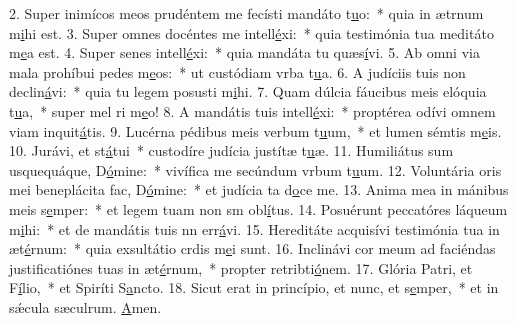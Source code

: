 2. Super inimícos meos prudéntem me fecísti mandáto t\uline{u}o:~* quia in ætrnum m\uline{i}hi est.
3. Super omnes docéntes me intell\uline{é}xi:~* quia testimónia tua meditáto m\uline{e}a est.
4. Super senes intell\uline{é}xi:~* quia mandáta tu quæs\uline{í}vi.
5. Ab omni via mala prohíbui pedes m\uline{e}os:~* ut custódiam vrba t\uline{u}a.
6. A judíciis tuis non declin\uline{á}vi:~* quia tu legem posusti m\uline{i}hi.
7. Quam dúlcia fáucibus meis elóquia t\uline{u}a,~* super mel ri m\uline{e}o!
8. A mandátis tuis intell\uline{é}xi:~* proptérea odívi omnem viam inquit\uline{á}tis.
9. Lucérna pédibus meis verbum t\uline{u}um,~* et lumen sémtis m\uline{e}is.
10. Jurávi, et st\uline{á}tui~* custodíre judícia justítæ t\uline{u}æ.
11. Humiliátus sum usquequáque, D\uline{ó}mine:~* vivífica me secúndum vrbum t\uline{u}um.
12. Voluntária oris mei beneplácita fac, D\uline{ó}mine:~* et judícia ta d\uline{o}ce me.
13. Anima mea in mánibus meis s\uline{e}mper:~* et legem tuam non sm obl\uline{í}tus.
14. Posuérunt peccatóres láqueum m\uline{i}hi:~* et de mandátis tuis nn err\uline{á}vi.
15. Hereditáte acquisívi testimónia tua in æt\uline{é}rnum:~* quia exsultátio crdis m\uline{e}i sunt.
16. Inclinávi cor meum ad faciéndas justificatiónes tuas in æt\uline{é}rnum,~* propter retribti\uline{ó}nem.
17. Glória Patri, et F\uline{í}lio,~* et Spiríti S\uline{a}ncto.
18. Sicut erat in princípio, et nunc, et s\uline{e}mper,~* et in sǽcula sæculrum. \uline{A}men.
